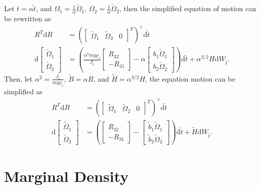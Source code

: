 \documentclass[10pt]{article}
\newcommand{\diff}[1]{\mathrm{d}#1}
\begin{document}
Let $t = \alpha\tilde{t}$, and $\Omega_1 = \tfrac{1}{\alpha}\tilde{\Omega}_1$, $\Omega_2 = \tfrac{1}{\alpha}\tilde{\Omega}_2$, then the simplified equation of motion can be rewritten as
\begin{align*}
	R^T\diff{R} &= \left( \begin{bmatrix} \tilde{\Omega}_1 & \tilde{\Omega}_2 & 0 \end{bmatrix}^T \right)^\vee \diff{\tilde{t}} \\
	\diff{\begin{bmatrix} \tilde{\Omega}_1 \\ \tilde{\Omega}_2 \end{bmatrix}} &= \left( \frac{\alpha^2mg\rho_z}{J_1} \begin{bmatrix} R_{32} \\ -R_{31} \end{bmatrix} - \alpha\begin{bmatrix} b_1\tilde{\Omega}_1 \\ b_2\tilde{\Omega}_2 \end{bmatrix} \right) \diff{\tilde{t}} + \alpha^{3/2}H\diff{W_{\tilde{t}}}.
\end{align*}
Then, let $\alpha^2 = \frac{J_1}{mg\rho_z}$, $\tilde{B} = \alpha B$, and $\tilde{H} = \alpha^{3/2}H$, the equation motion can be simplified as
\begin{align*}
	R^T\diff{R} &= \left( \begin{bmatrix} \tilde{\Omega}_1 & \tilde{\Omega}_2 & 0 \end{bmatrix}^T \right)^\vee \diff{\tilde{t}} \\
	\diff{\begin{bmatrix} \tilde{\Omega}_1 \\ \tilde{\Omega}_2 \end{bmatrix}} &= \left( \begin{bmatrix} R_{32} \\ -R_{31} \end{bmatrix} - \begin{bmatrix} \tilde{b}_1\tilde{\Omega}_1 \\ \tilde{b}_2\tilde{\Omega}_2 \end{bmatrix} \right) \diff{\tilde{t}} + \tilde{H}\diff{W_{\tilde{t}}}.
\end{align*}

\section{Marginal Density}
\end{document}
